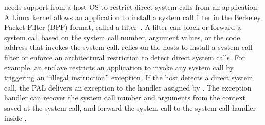 \thelibos{} needs support from a host OS to restrict direct system calls from an application.
A Linux kernel allows an application to install a system call filter in the Berkeley Packet Filter (BPF) format,
called a \seccomp{} filter~\cite{seccomp}.
A \seccomp{} filter can block or forward a system call based on the system call number,
argument values, or the code address that invokes the system call.
\graphene{} relies on the hosts to install a system call filter or enforce an architectural restriction to detect direct system calls.
For example, an \sgx{} enclave restricts an application to invoke any system call by triggering an ``illegal instruction'' exception. %
If the host detects a direct system call,
the PAL delivers an exception to the handler
assigned by \thelibos{}. %
The exception handler can recover the system call number and arguments
from the context saved at the system call,
and forward the system call to the system call handler
inside \thelibos{}.


